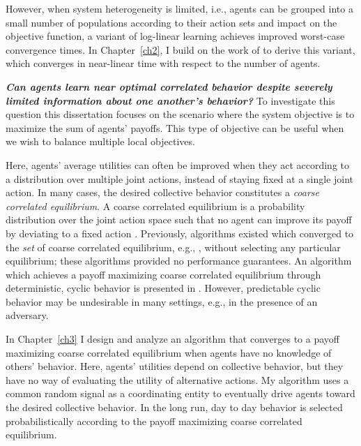 However, when system heterogeneity is limited, i.e., agents can be grouped into a small number of populations according to their action sets and impact on the objective function, a variant of log-linear learning achieves improved worst-case convergence times. In Chapter~\ref{ch2}, I build on the work of \cite{Shah2010} to derive this variant, which converges in near-linear time with respect to the number of agents. 



\noindent\textbf{\emph{Can agents learn near optimal correlated behavior despite severely limited information about one another's behavior? }}
To investigate this question this dissertation focuses on the scenario where the system objective is to maximize the sum of agents' payoffs. This type of objective can be useful when we wish to balance multiple local objectives. 

Here, agents' average utilities can often be improved when they act according to a distribution over multiple joint actions, instead of staying fixed at a single joint action.  In many cases, the desired collective behavior constitutes a \emph{coarse correlated equilibrium}. A coarse correlated equilibrium is a probability distribution over the joint action space such that no agent can improve its payoff by deviating to a fixed action \cite{Aumann1987}.  Previously, algorithms existed which converged to the \emph{set} of coarse correlated equilibrium, e.g., \cite{Hart2000}, without selecting any particular equilibrium; these algorithms provided no performance guarantees. An algorithm which achieves a payoff maximizing coarse correlated equilibrium through deterministic, cyclic behavior is presented in \cite{Marden2013c}. However, predictable cyclic behavior may be undesirable in many settings, e.g., in the presence of an adversary.

In Chapter~\ref{ch3} I design and analyze an algorithm that converges to a payoff maximizing coarse correlated equilibrium when agents have no knowledge of others' behavior. Here, agents' utilities depend on collective behavior, but they have no way of evaluating the utility of alternative actions. My algorithm uses a common random signal as a coordinating entity to eventually drive agents toward the desired collective behavior. In the long run, day to day behavior is selected probabilistically according to the payoff maximizing coarse correlated equilibrium.
 
